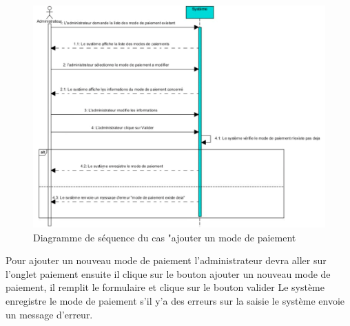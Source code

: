 \documentclass[a4paper, 12pt]{report}
\begin{document}
\begin{figure}[H]
	\centering
	\includegraphics{img/sequence/7}
	\caption{Diagramme de séquence du cas "ajouter un mode de paiement}
	\label{Tux}
\end{figure}
\noindent Pour ajouter un nouveau mode de paiement l’administrateur devra aller sur l’onglet paiement ensuite il clique sur le bouton ajouter un nouveau mode de paiement, il remplit le formulaire et clique sur le bouton valider
Le système enregistre le mode de paiement s’il y’a des erreurs sur la saisie le système envoie un message d’erreur.   
\end{document}
